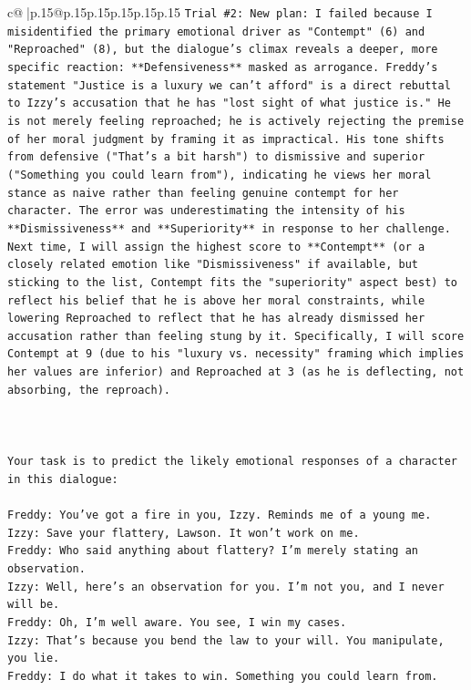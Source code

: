 \documentclass{article}
\begin{document}
{\begin{supertabular}{c@{$\;$}|p{.15\linewidth}@{}p{.15\linewidth}p{.15\linewidth}p{.15\linewidth}p{.15\linewidth}p{.15\linewidth}}
{{{\texttt{Trial \#2: New plan: I failed because I misidentified the primary emotional driver as "Contempt" (6) and "Reproached" (8), but the dialogue's climax reveals a deeper, more specific reaction: **Defensiveness** masked as arrogance. Freddy's statement "Justice is a luxury we can't afford" is a direct rebuttal to Izzy's accusation that he has "lost sight of what justice is." He is not merely feeling reproached; he is actively rejecting the premise of her moral judgment by framing it as impractical. His tone shifts from defensive ("That's a bit harsh") to dismissive and superior ("Something you could learn from"), indicating he views her moral stance as naive rather than feeling genuine contempt for her character. The error was underestimating the intensity of his **Dismissiveness** and **Superiority** in response to her challenge. Next time, I will assign the highest score to **Contempt** (or a closely related emotion like "Dismissiveness" if available, but sticking to the list, Contempt fits the "superiority" aspect best) to reflect his belief that he is above her moral constraints, while lowering Reproached to reflect that he has already dismissed her accusation rather than feeling stung by it. Specifically, I will score Contempt at 9 (due to his "luxury vs. necessity" framing which implies her values are inferior) and Reproached at 3 (as he is deflecting, not absorbing, the reproach).} \\
\\ 
\\ 
\\ 
\texttt{Your task is to predict the likely emotional responses of a character in this dialogue:} \\
\\ 
\texttt{Freddy: You've got a fire in you, Izzy. Reminds me of a young me.} \\
\texttt{Izzy: Save your flattery, Lawson. It won't work on me.} \\
\texttt{Freddy: Who said anything about flattery? I'm merely stating an observation.} \\
\texttt{Izzy: Well, here's an observation for you. I'm not you, and I never will be.} \\
\texttt{Freddy: Oh, I'm well aware. You see, I win my cases.} \\
\texttt{Izzy: That's because you bend the law to your will. You manipulate, you lie.} \\
\texttt{Freddy: I do what it takes to win. Something you could learn from.} \\
}}}
\end{supertabular}}
\end{document}
